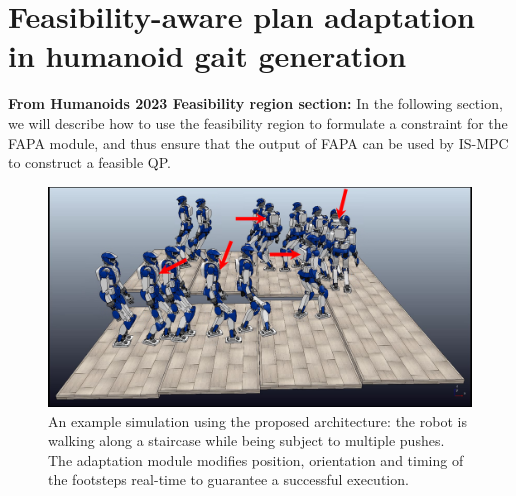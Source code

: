 \chapter{Feasibility-aware plan adaptation in humanoid gait generation}

\textbf{From Humanoids 2023 Feasibility region section:} In the following
section, we will describe how to use the feasibility region to formulate a
constraint for the FAPA module, and thus ensure that the output of FAPA can be
used by IS-MPC to construct a feasible QP.


\begin{figure}
    \centering
    \includegraphics[trim={0.5cm 1.5cm 2cm 0.1cm},clip,width=0.9\columnwidth]{figures/strobo-staircase-with-pushes.png}
    \caption{An example simulation using the proposed architecture: the robot is walking along a staircase while being subject to multiple pushes. The adaptation module modifies position, orientation and timing of the footsteps real-time to guarantee a successful execution.}
    \label{fig:FAPA:two-patches-mixed-integer-snapshots}
\end{figure}

